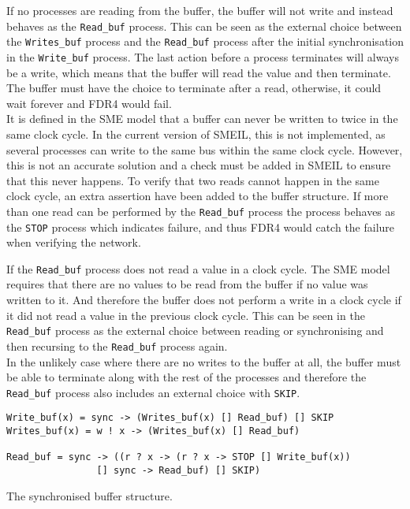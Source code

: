 If no processes are reading from the buffer, the buffer will not write and instead behaves as the \texttt{Read\_buf} process. This can be seen as the external choice between the \texttt{Writes\_buf} process and the \texttt{Read\_buf} process after the initial synchronisation in the \texttt{Write\_buf} process.
The last action before a process terminates will always be a write, which means that the buffer will read the value and then terminate. The buffer must have the choice to terminate after a read, otherwise, it could wait forever and FDR4 would fail. \\

It is defined in the SME model that a buffer can never be written to twice in the same clock cycle. In the current version of SMEIL, this is not implemented, as several processes can write to the same bus within the same clock cycle. However, this is not an accurate solution and a check must be added in SMEIL to ensure that this never happens. To verify that two reads cannot happen in the same clock cycle, an extra assertion have been added to the buffer structure.
If more than one read can be performed by the \texttt{Read\_buf} process the process behaves as the \texttt{STOP} process which indicates failure, and thus FDR4 would catch the failure when verifying the network.

If the \texttt{Read\_buf} process does not read a value in a clock cycle.
The SME model requires that there are no values to be read from the buffer if no value was written to it. And therefore the buffer does not perform a write in a clock cycle if it did not read a value in the previous clock cycle. This can be seen in the \texttt{Read\_buf} process as the external choice between reading or synchronising and then recursing to the \texttt{Read\_buf} process again.\\

In the unlikely case where there are no writes to the buffer at all, the buffer must be able to terminate along with the rest of the processes and therefore the \texttt{Read\_buf} process also includes an external choice with \texttt{SKIP}.

\begin{listing}
\begin{verbatim}
Write_buf(x) = sync -> (Writes_buf(x) [] Read_buf) [] SKIP
Writes_buf(x) = w ! x -> (Writes_buf(x) [] Read_buf)

Read_buf = sync -> ((r ? x -> (r ? x -> STOP [] Write_buf(x))
                [] sync -> Read_buf) [] SKIP)
\end{verbatim}
\caption{The synchronised buffer structure.}
\label{lst:buffer}
\end{listing}

